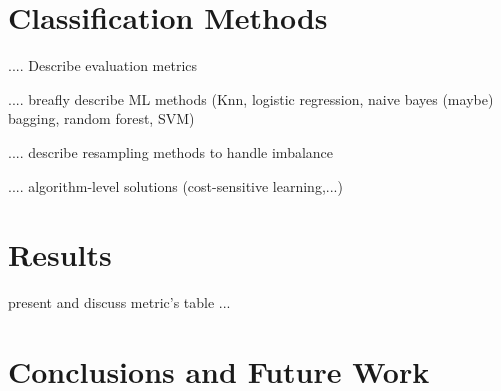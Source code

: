 \documentclass[12pt,letterpaper]{article}
\begin{document}
	\section{Classification Methods}
	.... Describe evaluation metrics
	
	.... breafly describe ML methods (Knn, logistic regression, naive bayes (maybe) bagging, random forest, SVM) 
	
	.... describe resampling methods to handle imbalance
	
	.... algorithm-level solutions (cost-sensitive learning,...)
	
	\section{Results}
	present and discuss metric's table ...
	
	\section{Conclusions and Future Work}
	\newpage
	\printbibliography
\end{document}
